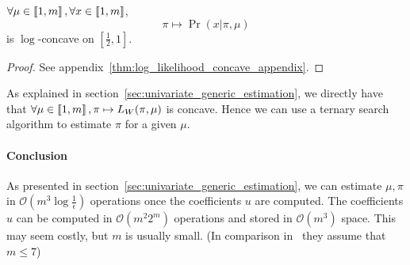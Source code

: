 \begin{thm}
    \label{thm:log_likelihood_concave}
    $\forall \mu \in \left\llbracket1, m\right\rrbracket,\forall x \in \left\llbracket1, m\right\rrbracket$, 
    \[ \pi \mapsto \Pr(x|\pi, \mu) \]
    is $\log$-concave on $[\frac{1}{2}, 1]$.
\end{thm}
\begin{proof}
    See appendix~\ref{thm:log_likelihood_concave_appendix}.
\end{proof}

As explained in section~\ref{sec:univariate_generic_estimation}, we directly have that $\forall \mu \in \left\llbracket1, m\right\rrbracket, \pi \mapsto L_W(\pi, \mu)$ is concave. Hence we can use a ternary search algorithm to estimate $\pi$ for a given $\mu$.

\paragraph{Conclusion}

As presented in section~\ref{sec:univariate_generic_estimation}, we can estimate $\mu, \pi$ in $\mathcal O(m^3 \log \frac{1}{\epsilon})$ operations once the coefficients $u$ are computed. The coefficients $u$ can be computed in $\mathcal O(m^2 2^m)$ operations and stored in $\mathcal O(m^3)$ space. This may seem costly, but $m$ is usually small. (In comparison in~\cite{biernacki2016model} they assume that $m \leq 7$)
